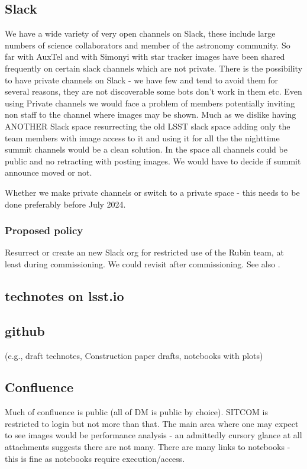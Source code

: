 \subsection{Slack}
We have a wide variety of very open channels on Slack, these include large numbers of science collaborators and member of the astronomy community.
So far with AuxTel and with Simonyi with star tracker images have been shared frequently on certain slack channels which are not private.
There is the possibility to have private channels on Slack - we have few and tend to avoid them for several reasons, they are not discoverable some bots don't work in them etc.
Even using Private channels we would face a problem of members potentially inviting non staff to the channel where images may be shown.
Much as we dislike having ANOTHER Slack space resurrecting the old LSST slack space adding only the team members with image access to it and using it for all the the nighttime summit channels would be a clean solution.
In the space all channels could be public and no retracting with posting images.
We would have to decide if summit announce moved or not.

Whether we make private channels or switch to a private space - this needs to be done preferably before July 2024.
\subsubsection{Proposed policy}
Resurrect or create an new Slack org for restricted use of the Rubin team, at least during commissioning.
We could revisit after commissioning.
See also .

\subsection{technotes on lsst.io}

\subsection{github }
(e.g., draft technotes, Construction paper drafts, notebooks with plots)

\subsection{Confluence}
Much of confluence is public (all of DM is public by choice).
SITCOM is restricted to login but not more than that.
The main area where one may expect to see images would be performance analysis - an admittedly  cursory glance at all attachments suggests there are not many.
There are many links to notebooks - this is fine as notebooks require execution/access.

